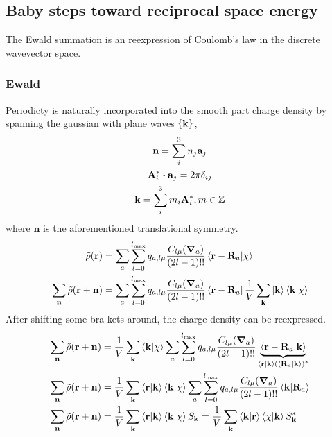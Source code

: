 \documentclass[12pt]{extarticle}
\renewcommand{\bf}{\mathbf}
\begin{document}
    \subsection{Baby steps toward reciprocal space energy}
    The Ewald summation is an reexpression of Coulomb's law in the discrete wavevector space.
    \subsubsection{Ewald}
    Periodicty is naturally incorporated into the smooth part charge density by spanning the gaussian with plane waves \(\qty{ \bf k}\), \begin{gather*}
        \bf n = \sum_i^3 n_j \bf a_j\\
        \bf A^*_i \dotproduct \bf a_j = 2 \pi \delta_{ij}\\
        \bf k = \sum_i^3 m_i \bf A^*_i, m \in \mathbb{Z}
    \end{gather*}
    where \(\bf n\) is the aforementioned translational symmetry.
    \begin{align*}
        \tilde{\rho} ( \bf r) &=  \sum_{a} \sum_{l = 0}^{l_{\max}} q_{a, l \mu} \frac{C_{l \mu} (\grad_a)}{(2l - 1)!!} \bra{\bf r - \bf R_a} \ket{\chi } \\
        \sum_{\bf n} \tilde{\rho} ( \bf r + \bf n) &=  \sum_{a} \sum_{l = 0}^{l_{\max}} q_{a, l \mu} \frac{C_{l \mu} (\grad_a)}{(2l - 1)!!} \bra{\bf r - \bf R_a} \frac{1}{V}\sum_{\bf k} \ket{\bf k} \bra{\bf k}  \ket{\chi } 
    \end{align*}
    After shifting some bra-kets around, the charge density can be reexpressed.
    \begin{align}
        \sum_{\bf n} \tilde{\rho} ( \bf r + \bf n) &= \frac{1}{V}\sum_{\bf k}  \bra{\bf k}  \ket{\chi }  \sum_{a} \sum_{l = 0}^{l_{\max}} q_{a, l \mu} \frac{C_{l \mu} (\grad_a)}{(2l - 1)!!} \underbrace{\bra{\bf r - \bf R_a} \ket{\bf k}}_{\bra{\bf r} \ket{\bf k} \pqty{\bra{\bf R_a} \ket{\bf k} }^*  } \nonumber\\
        \sum_{\bf n} \tilde{\rho} ( \bf r + \bf n) &= \frac{1}{V}\sum_{\bf k} \bra{\bf r} \ket{\bf k}  \bra{\bf k}  \ket{\chi }  \sum_{a} \sum_{l = 0}^{l_{\max}} q_{a, l \mu} \frac{C_{l \mu} (\grad_a)}{(2l - 1)!!} \bra{\bf k} \ket{\bf R_a} \nonumber\\
        \sum_{\bf n} \tilde{\rho} ( \bf r + \bf n) &= \frac{1}{V}\sum_{\bf k} \bra{\bf r} \ket{\bf k}  \bra{\bf k}  \ket{\chi }  S_{\bf k} = \frac{1}{V}\sum_{\bf k} \bra{\bf k} \ket{\bf r}\bra{\chi }\ket{\bf k}  S_{\bf k}^* \label{eq:rhotil}
    \end{align}
\end{document}
